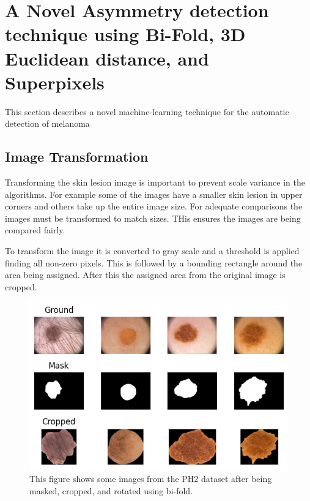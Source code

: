 \begin{figure}
    \centering
    \caption{} 
\end{figure}\label{asy-examples}


\section{A Novel Asymmetry detection technique using Bi-Fold, 3D Euclidean distance, and Superpixels}
This section describes a novel machine-learning technique for the automatic detection of melanoma

\subsection{Image Transformation}
Transforming the skin lesion image is important to prevent scale variance in the algorithms. For example some of the images have a smaller skin lesion in upper corners and others take up the entire image size. For adequate comparisons the images must be transformed to match sizes. THis ensures the images are being compared fairly.

To transform the image it is converted to gray scale and a threshold is applied finding all non-zero pixels. This is followed by a bounding rectangle around the area being assigned. After this the assigned area from the original image is cropped.

\begin{figure}
    \centering
    \includegraphics[scale=1.2]{images/asymmetry/asy-cropped.png}
    \caption{This figure shows some images from the PH2 dataset after being masked, cropped, and rotated using bi-fold.} 
\end{figure}\label{asy-cropped}

